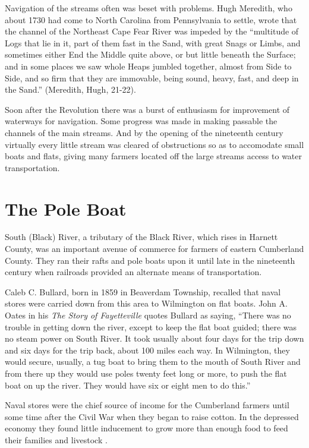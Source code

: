 \documentclass[11pt, a5paper, openright]{book}
\begin{document}
Navigation of the streams often was beset with problems.  Hugh
Meredith, who about 1730 had come to North Carolina from Pennsylvania
to settle, wrote that the channel of the Northeast Cape Fear River was
impeded by the ``multitude of Logs that lie in it, part of them fast in
the Sand, with great Snags or Limbs, and sometimes either End the
Middle quite above, or but little beneath the Surface; and in some
places we saw whole Heaps jumbled together, almost from Side to Side,
and so firm that they are immovable, being sound, heavy, fast, and
deep in the Sand.'' (Meredith, Hugh, 21-22).\par %

Soon after the Revolution there was a burst of enthusiasm for
improvement of waterways for navigation.  Some progress was made in
making passable the channels of the main streams.  And by the opening
of the nineteenth century virtually every little stream was cleared of
obstructions so as to accomodate small boats and flats, giving many
farmers located off the large streams access to water
transportation.\par

\section{The Pole Boat}

South (Black) River, a tributary of the Black River, which rises in
Harnett County, was an important avenue of commerce for farmers of
eastern Cumberland County.  They ran their rafts and pole boats upon
it until late in the nineteenth century when railroads provided an
alternate means of transportation.\par

Caleb C. Bullard, born in 1859 in Beaverdam Township, recalled that
naval stores were carried down from this area to Wilmington on flat
boats.  John A. Oates in his \textit{The Story of Fayetteville} quotes
Bullard as saying, ``There was no trouble in getting down the river,
except to keep the flat boat guided; there was no steam power on South
River.  It took usually about four days for the trip down and six days
for the trip back, about 100 miles each way.  In Wilmington, they
would secure, usually, a tug boat to bring them to the mouth of South
River and from there up they would use poles twenty feet long or more,
to push the flat boat on up the river.  They would have six or eight
men to do this.''\par

Naval stores were the chief source of income for the Cumberland
farmers until some time after the Civil War when they began to raise
cotton.  In the depressed economy they found little inducement to grow
more than enough food to feed their families and livestock
\citep[432]{oatesja}.\par
\end{document}
